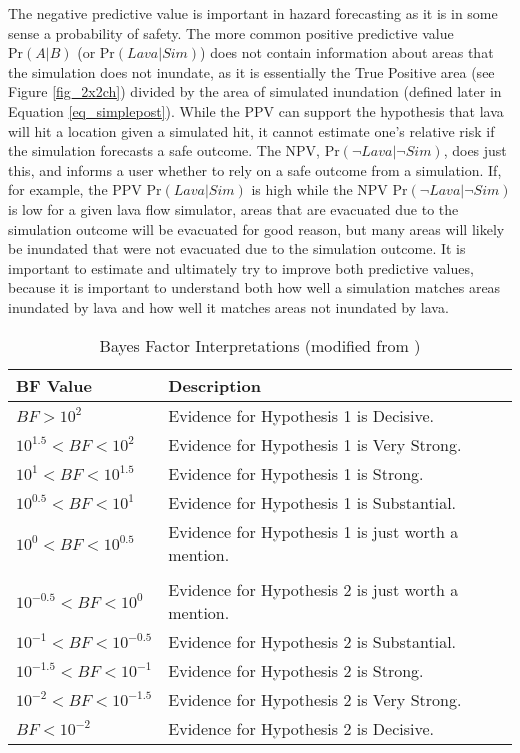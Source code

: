 	The negative predictive value is important in hazard forecasting as it is in some sense a probability of safety. The more common positive predictive value $\text{Pr}(A|B)$ (or $\text{Pr}(Lava|Sim)$) does not contain information about areas that the simulation does not inundate, as it is essentially the True Positive area (see Figure \ref{fig_2x2ch}) divided by the area of simulated inundation (defined later in Equation \ref{eq_simplepost}). While the PPV can support the hypothesis that lava will hit a location given a simulated hit, it cannot estimate one's relative risk if the simulation forecasts a safe outcome. The NPV, $\text{Pr}(\neg Lava|\neg Sim)$, does just this, and informs a user whether to rely on a safe outcome from a simulation. If, for example, the PPV $\text{Pr}(Lava|Sim)$ is high while the NPV $\text{Pr}(\neg Lava|\neg Sim)$ is low for a given lava flow simulator, areas that are evacuated due to the simulation outcome will be evacuated for good reason, but many areas will likely be inundated that were not evacuated due to the simulation outcome. It is important to estimate and ultimately try to improve both predictive values, because it is important to understand both how well a simulation matches areas inundated by lava and how well it matches areas not inundated by lava.
	
	\begin{table}[h]
		\centering
		\caption{Bayes Factor Interpretations (modified from \citet{aspinall2003evidence})}
		\begin{tabular}{l l}
			\toprule
			BF Value & Description\\
			\midrule
			$BF>10^2$ & Evidence for Hypothesis 1 is Decisive.\\
			$10^{1.5}<BF<10^2$ & Evidence for Hypothesis 1 is Very Strong.\\
			$10^{1}<BF<10^{1.5}$ & Evidence for Hypothesis 1 is Strong.\\
			$10^{0.5}<BF<10^{1}$ & Evidence for Hypothesis 1 is Substantial.\\
			$10^{0}<BF<10^{0.5}$ & Evidence for Hypothesis 1 is just worth a mention.\\\\
			$10^{-0.5}<BF<10^{0}$ & Evidence for Hypothesis 2 is just worth a mention.\\
			$10^{-1}<BF<10^{-0.5}$ & Evidence for Hypothesis 2 is Substantial.\\
			$10^{-1.5}<BF<10^{-1}$ & Evidence for Hypothesis 2 is Strong.\\
			$10^{-2}<BF<10^{-1.5}$ & Evidence for Hypothesis 2 is Very Strong.\\
			$BF<10^{-2}$ & Evidence for Hypothesis 2 is Decisive.\\
			\bottomrule
		\end{tabular}
		\label{tab_BFinterps}
	\end{table}
	
